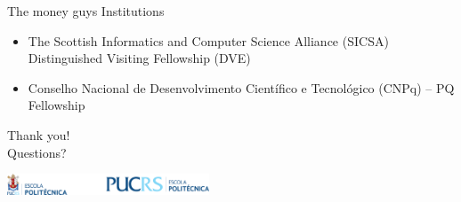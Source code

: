 \documentclass[usenames,dvipsnames]{beamer}
\begin{document}
\begin{frame}[c]{The money guys}
	Institutions
	\begin{itemize}
		\item The Scottish Informatics and Computer Science Alliance (SICSA) \\ Distinguished Visiting Fellowship (DVE)
		\item Conselho Nacional de Desenvolvimento Científico e Tecnológico (CNPq) -- PQ Fellowship
	\end{itemize}
\end{frame}




	{
    \begin{frame}[c]{}
    		\centering
    		Thank you!
			\\
			Questions?
			\begin{center}
				\includegraphics[width=6cm]{politecnica.pdf}
			\end{center}
    \end{frame}
    }

\end{document}
